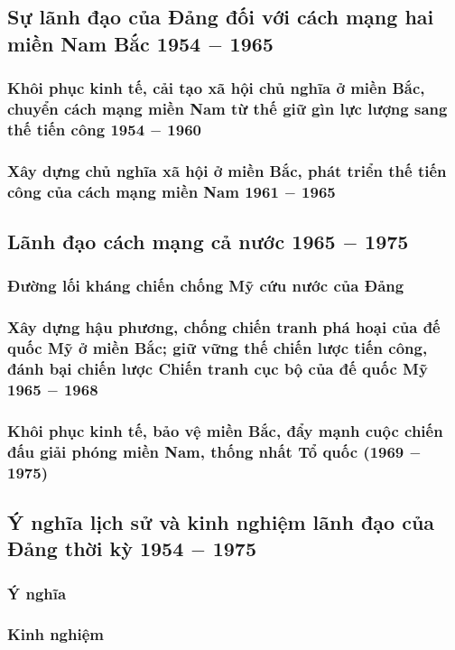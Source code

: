 \subsection{Sự lãnh đạo của Đảng đối với cách mạng hai miền Nam Bắc 1954 $-$ 1965}
\subsubsection{Khôi phục kinh tế, cải tạo xã hội chủ nghĩa ở miền Bắc, chuyển cách mạng miền Nam từ thế giữ gìn lực lượng sang thế tiến công 1954 $-$ 1960}
\subsubsection{Xây dựng chủ nghĩa xã hội ở miền Bắc, phát triển thế tiến công của cách mạng miền Nam 1961 $-$ 1965}

\subsection{Lãnh đạo cách mạng cả nước 1965 $-$ 1975}
\subsubsection{Đường lối kháng chiến chống Mỹ cứu nước của Đảng}
\subsubsection{Xây dựng hậu phương, chống chiến tranh phá hoại của đế quốc Mỹ ở miền Bắc; giữ vững thế chiến lược tiến công, đánh bại chiến lược Chiến tranh cục bộ của đế quốc Mỹ 1965 $-$ 1968}
\subsubsection{Khôi phục kinh tế, bảo vệ miền Bắc, đẩy mạnh cuộc chiến đấu giải phóng miền Nam, thống nhất Tổ quốc (1969 $-$ 1975)}

\subsection{Ý nghĩa lịch sử và kinh nghiệm lãnh đạo của Đảng thời kỳ 1954 $-$ 1975}
\subsubsection{Ý nghĩa}
\subsubsection{Kinh nghiệm}